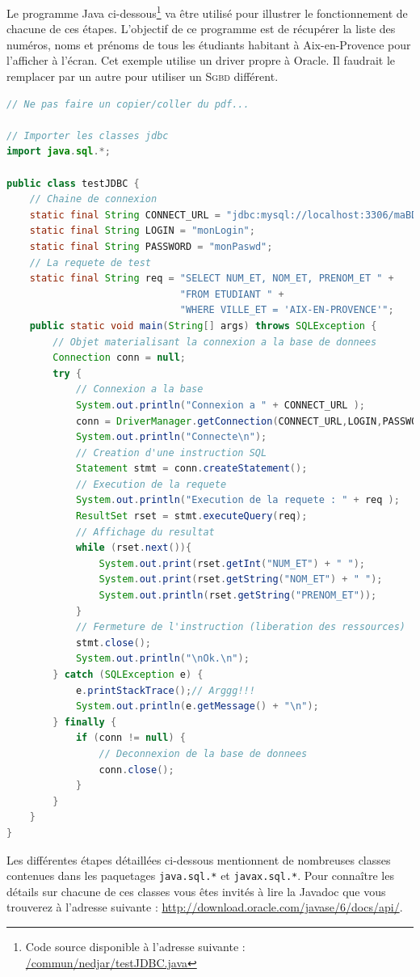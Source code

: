 \documentclass[a4paper,11pt]{article}
\begin{document}
Le programme Java ci-dessous\footnote{Code source disponible à l'adresse suivante : 
\url{/commun/nedjar/testJDBC.java}} va être utilisé pour illustrer le fonctionnement de chacune 
de ces étapes. L'objectif de ce programme est de récupérer la liste des numéros, noms et prénoms de tous les étudiants 
habitant à Aix-en-Provence pour l'afficher à l'écran. Cet exemple utilise un driver propre à 
Oracle. Il faudrait le remplacer par un autre pour utiliser un \textsc{Sgbd} différent.
\pagebreak
\begin{lstlisting}[language=java]
// Ne pas faire un copier/coller du pdf...

// Importer les classes jdbc
import java.sql.*;

public class testJDBC {
	// Chaine de connexion
	static final String CONNECT_URL = "jdbc:mysql://localhost:3306/maBD";
	static final String LOGIN = "monLogin";
	static final String PASSWORD = "monPaswd";
	// La requete de test
	static final String req = "SELECT NUM_ET, NOM_ET, PRENOM_ET " +
	                          "FROM ETUDIANT " +
	                          "WHERE VILLE_ET = 'AIX-EN-PROVENCE'";                                     
	public static void main(String[] args) throws SQLException {
		// Objet materialisant la connexion a la base de donnees
		Connection conn = null;
		try {
			// Connexion a la base
			System.out.println("Connexion a " + CONNECT_URL );
			conn = DriverManager.getConnection(CONNECT_URL,LOGIN,PASSWORD);
			System.out.println("Connecte\n");
			// Creation d'une instruction SQL
			Statement stmt = conn.createStatement();
			// Execution de la requete
			System.out.println("Execution de la requete : " + req );
			ResultSet rset = stmt.executeQuery(req);
			// Affichage du resultat
			while (rset.next()){	
				System.out.print(rset.getInt("NUM_ET") + " ");
				System.out.print(rset.getString("NOM_ET") + " ");
				System.out.println(rset.getString("PRENOM_ET"));
			}
			// Fermeture de l'instruction (liberation des ressources)
			stmt.close();
			System.out.println("\nOk.\n");
		} catch (SQLException e) {
			e.printStackTrace();// Arggg!!!
			System.out.println(e.getMessage() + "\n");
		} finally {
			if (conn != null) {
				// Deconnexion de la base de donnees
				conn.close();
			}
		}
	}
}
\end{lstlisting}
Les différentes étapes détaillées ci-dessous mentionnent de nombreuses classes contenues dans les paquetages 
\texttt{java.sql.*} et \texttt{javax.sql.*}. Pour connaître les détails sur chacune de ces classes vous êtes 
invités à lire la Javadoc que vous trouverez à l'adresse suivante : \url{http://download.oracle.com/javase/6/docs/api/}.
\end{document}
